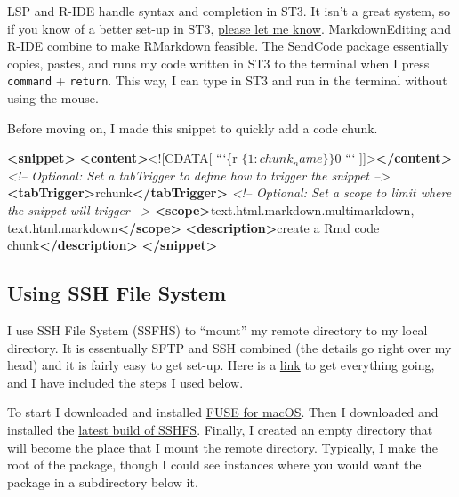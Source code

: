 \documentclass[]{book}
\newenvironment{Shaded}{\begin{snugshade}}{\end{snugshade}}
\newcommand{\KeywordTok}[1]{\textcolor[rgb]{0.13,0.29,0.53}{\textbf{#1}}}
\newcommand{\BaseNTok}[1]{\textcolor[rgb]{0.00,0.00,0.81}{#1}}
\newcommand{\CommentTok}[1]{\textcolor[rgb]{0.56,0.35,0.01}{\textit{#1}}}
\newcommand{\NormalTok}[1]{#1}
\begin{document}
LSP and R-IDE handle syntax and completion in ST3. It isn't a great
system, so if you know of a better set-up in ST3,
\href{https://github.com/jhrcook/package-as-analysis/issues}{please let
me know}. MarkdownEditing and R-IDE combine to make RMarkdown feasible.
The SendCode package essentially copies, pastes, and runs my code
written in ST3 to the terminal when I press \texttt{command} +
\texttt{return}. This way, I can type in ST3 and run in the terminal
without using the mouse.

Before moving on, I made this snippet to quickly add a code chunk.

\begin{Shaded}
\begin{Highlighting}[]
\KeywordTok{<snippet>}
        \KeywordTok{<content>}\BaseNTok{<![CDATA[}
\NormalTok{```\{r $\{1:chunk_name\}\}}
\NormalTok{$0}
\NormalTok{```}
\BaseNTok{]]>}\KeywordTok{</content>}
        \CommentTok{<!-- Optional: Set a tabTrigger to define how to trigger the snippet -->}
        \KeywordTok{<tabTrigger>}\NormalTok{rchunk}\KeywordTok{</tabTrigger>}
        \CommentTok{<!-- Optional: Set a scope to limit where the snippet will trigger -->}
        \KeywordTok{<scope>}\NormalTok{text.html.markdown.multimarkdown, text.html.markdown}\KeywordTok{</scope>}
        \KeywordTok{<description>}\NormalTok{create a Rmd code chunk}\KeywordTok{</description>}
\KeywordTok{</snippet>}
\end{Highlighting}
\end{Shaded}

\subsection{Using SSH File System}\label{using-ssh-file-system}

I use SSH File System (SSFHS) to ``mount'' my remote directory to my
local directory. It is essentually SFTP and SSH combined (the details go
right over my head) and it is fairly easy to get set-up. Here is a
\href{https://github.com/osxfuse/osxfuse/wiki/SSHFS}{link} to get
everything going, and I have included the steps I used below.

To start I downloaded and installed
\href{https://osxfuse.github.io}{FUSE for macOS}. Then I downloaded and
installed the \href{https://github.com/osxfuse/sshfs/releases}{latest
build of SSHFS}. Finally, I created an empty directory that will become
the place that I mount the remote directory. Typically, I make the root
of the package, though I could see instances where you would want the
package in a subdirectory below it.
\end{document}
